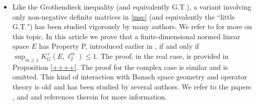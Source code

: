 \documentclass[a4paper,oneside,11pt, reqno]{amsart}
\numberwithin{equation}{section}
\theoremstyle{plain}
\begin{document}
\begin{itemize}[leftmargin=\dimexpr 30pt]


\item Like the Grothendieck inequality (and equivalently G.T.), a variant involving only non-negative definite matrices in \eqref{msc} (and equivalently the ``little G.T.") has been studied vigorously by many authors. We refer to \cite[Chapter 5]{Pisier-factorization} for more on this topic. In this article we prove that a finite-dimensional normed linear space $E$ has Property P, introduced earlier in \cite{BM}, if and only if $\sup_{m\geqslant 1}K^+_G(E,\ell^m_2) \leqslant 1$. The proof, in the real case, is provided in Proposition \ref{++++}. The proof for the complex case is similar and is omitted. This kind of interaction with Banach space geometry and operator theory is old and has been studied by several authors. We refer to the  papers \cite{vip}, \cite{BM} and \cite{AFHS95} and references therein for more information.
\end{itemize}
\end{document}
